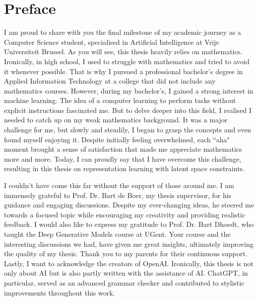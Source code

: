 \chapter*{Preface}

I am proud to share with you the final milestone of my academic journey as a Computer Science student, specialised in Artificial Intelligence at Vrije Universiteit Brussel. As you will see, this thesis heavily relies on mathematics. Ironically, in high school, I used to struggle with mathematics and tried to avoid it whenever possible. That is why I pursued a professional bachelor's degree in Applied Information Technology at a college that did not include any mathematics courses. However, during my bachelor's, I gained a strong interest in machine learning. The idea of a computer learning to perform tasks without explicit instructions fascinated me. But to delve deeper into this field, I realised I needed to catch up on my weak mathematics background. It was a major challenge for me, but slowly and steadily, I began to grasp the concepts and even found myself enjoying it. Despite initially feeling overwhelmed, each ``aha" moment brought a sense of satisfaction that made me appreciate mathematics more and more. Today, I can proudly say that I have overcome this challenge, resulting in this thesis on representation learning with latent space constraints.

I couldn't have come this far without the support of those around me. I am immensely grateful to Prof. Dr. Bart de Boer, my thesis supervisor, for his guidance and engaging discussions. Despite my ever-changing ideas, he steered me towards a focused topic while encouraging my creativity and providing realistic feedback. I would also like to express my gratitude to Prof. Dr. Bart Dhoedt, who taught the Deep Generative Models course at UGent. Your course and the interesting discussions we had, have given me great insights, ultimately improving the quality of my thesis. Thank you to my parents for their continuous support. Lastly, I want to acknowledge the creators of OpenAI. Ironically, this thesis is not only about AI but is also partly written with the assistance of AI. ChatGPT, in particular, served as an advanced grammar checker and contributed to stylistic improvements throughout this work.







